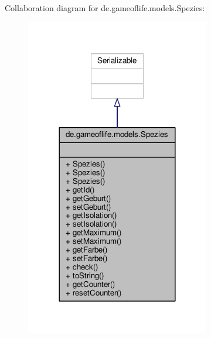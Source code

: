 Collaboration diagram for de.\-gameoflife.\-models.\-Spezies\-:\nopagebreak
\begin{figure}[H]
\begin{center}
\leavevmode
\includegraphics[width=228pt]{classde_1_1gameoflife_1_1models_1_1Spezies__coll__graph}
\end{center}
\end{figure}

